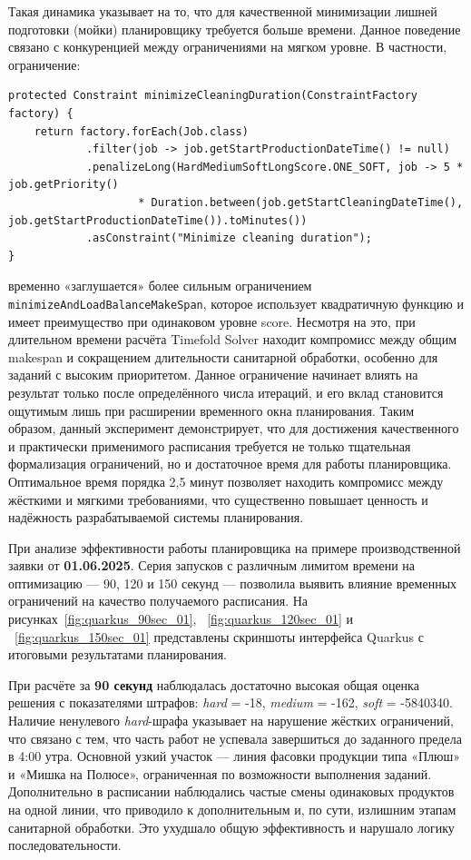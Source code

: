 Такая динамика указывает на то, что для качественной минимизации лишней подготовки (мойки) планировщику требуется больше времени. Данное поведение связано с конкуренцией между ограничениями на мягком уровне. В частности, ограничение:

\begin{lstlisting}[caption={Ограничение minimizeCleaningDuration}, label={lst:minimizeCleaningDuration}, basicstyle=\ttfamily\footnotesize, breaklines=true]
protected Constraint minimizeCleaningDuration(ConstraintFactory factory) {
    return factory.forEach(Job.class)
            .filter(job -> job.getStartProductionDateTime() != null)
            .penalizeLong(HardMediumSoftLongScore.ONE_SOFT, job -> 5 * job.getPriority()
                    * Duration.between(job.getStartCleaningDateTime(), job.getStartProductionDateTime()).toMinutes())
            .asConstraint("Minimize cleaning duration");
}
\end{lstlisting}

временно «заглушается» более сильным ограничением \texttt{minimizeAndLoadBalanceMakeSpan}, которое использует квадратичную функцию и имеет преимущество при одинаковом уровне score. Несмотря на это, при длительном времени расчёта Timefold Solver находит компромисс между общим makespan и сокращением длительности санитарной обработки, особенно для заданий с высоким приоритетом.
Данное ограничение начинает влиять на результат только после определённого числа итераций, и его вклад становится ощутимым лишь при расширении временного окна планирования. Таким образом, данный эксперимент демонстрирует, что для достижения качественного и практически применимого расписания требуется не только тщательная формализация ограничений, но и достаточное время для работы планировщика. Оптимальное время порядка 2,5 минут позволяет находить компромисс между жёсткими и мягкими требованиями, что существенно повышает ценность и надёжность разрабатываемой системы планирования.

При анализе эффективности работы планировщика на примере производственной заявки от \textbf{01.06.2025}. Серия запусков с различным лимитом времени на оптимизацию — 90, 120 и 150 секунд — позволила выявить влияние временных ограничений на качество получаемого расписания. На рисунках~\ref{fig:quarkus_90sec_01}, ~\ref{fig:quarkus_120sec_01} и ~\ref{fig:quarkus_150sec_01} представлены скриншоты интерфейса Quarkus с итоговыми результатами планирования.

При расчёте за \textbf{90 секунд} наблюдалась достаточно высокая общая оценка решения с показателями штрафов: \textit{hard} = -18, \textit{medium} = -162, \textit{soft} = -5840340. Наличие ненулевого \textit{hard}-шрафа указывает на нарушение жёстких ограничений, что связано с тем, что часть работ не успевала завершиться до заданного предела в 4:00 утра. Основной узкий участок — линия фасовки продукции типа «Плюш» и «Мишка на Полюсе», ограниченная по возможности выполнения заданий. Дополнительно в расписании наблюдались частые смены одинаковых продуктов на одной линии, что приводило к дополнительным и, по сути, излишним этапам санитарной обработки. Это ухудшало общую эффективность и нарушало логику последовательности.

